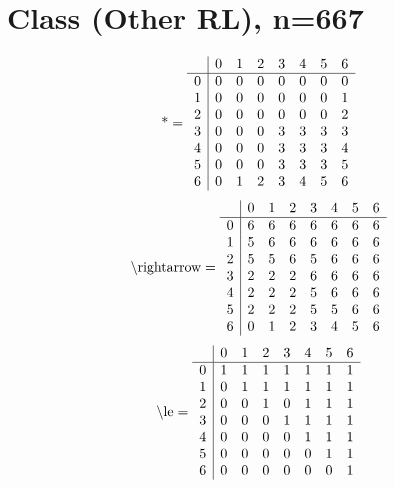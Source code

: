 \documentclass[11pt]{article}
\begin{document}
\section{Class (Other RL), n=667}
\[\text{*} = 
\begin{array}{r | r r r r r r r}
 & 0 & 1 & 2 & 3 & 4 & 5 & 6 \\ \hline
0 & 0 & 0 & 0 & 0 & 0 & 0 & 0 \\
1 & 0 & 0 & 0 & 0 & 0 & 0 & 1 \\
2 & 0 & 0 & 0 & 0 & 0 & 0 & 2 \\
3 & 0 & 0 & 0 & 3 & 3 & 3 & 3 \\
4 & 0 & 0 & 0 & 3 & 3 & 3 & 4 \\
5 & 0 & 0 & 0 & 3 & 3 & 3 & 5 \\
6 & 0 & 1 & 2 & 3 & 4 & 5 & 6 \\
\end{array}
\]
\[\text{\textbackslash rightarrow} = 
\begin{array}{r | r r r r r r r}
 & 0 & 1 & 2 & 3 & 4 & 5 & 6 \\ \hline
0 & 6 & 6 & 6 & 6 & 6 & 6 & 6 \\
1 & 5 & 6 & 6 & 6 & 6 & 6 & 6 \\
2 & 5 & 5 & 6 & 5 & 6 & 6 & 6 \\
3 & 2 & 2 & 2 & 6 & 6 & 6 & 6 \\
4 & 2 & 2 & 2 & 5 & 6 & 6 & 6 \\
5 & 2 & 2 & 2 & 5 & 5 & 6 & 6 \\
6 & 0 & 1 & 2 & 3 & 4 & 5 & 6 \\
\end{array}
\]
\[\text{\textbackslash le} = 
\begin{array}{r | r r r r r r r}
 & 0 & 1 & 2 & 3 & 4 & 5 & 6 \\ \hline
0 & 1 & 1 & 1 & 1 & 1 & 1 & 1 \\
1 & 0 & 1 & 1 & 1 & 1 & 1 & 1 \\
2 & 0 & 0 & 1 & 0 & 1 & 1 & 1 \\
3 & 0 & 0 & 0 & 1 & 1 & 1 & 1 \\
4 & 0 & 0 & 0 & 0 & 1 & 1 & 1 \\
5 & 0 & 0 & 0 & 0 & 0 & 1 & 1 \\
6 & 0 & 0 & 0 & 0 & 0 & 0 & 1 \\
\end{array}
\]
\end{document}
